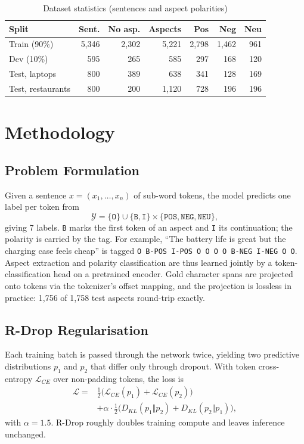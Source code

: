 \documentclass[conference]{IEEEtran}
\begin{document}
\begin{table}[t]
\caption{Dataset statistics (sentences and aspect polarities)}
\label{tab:data}
\centering
\setlength{\tabcolsep}{4pt}
\begin{tabular}{@{}lrrrrrr@{}}
\toprule
Split & Sent. & No asp. & Aspects & Pos & Neg & Neu \\
\midrule
Train (90\%)       & 5,346 & 2,302 & 5,221 & 2,798 & 1,462 & 961 \\
Dev (10\%)         &   595 &   265 &   585 &   297 &   168 & 120 \\
Test, laptops      &   800 &   389 &   638 &   341 &   128 & 169 \\
Test, restaurants  &   800 &   200 & 1,120 &   728 &   196 & 196 \\
\bottomrule
\end{tabular}
\end{table}

\section{Methodology}

\subsection{Problem Formulation}
Given a sentence $x=(x_1,\dots,x_n)$ of sub-word tokens, the model predicts one label per token from
\begin{equation}
\mathcal{Y}=\{\texttt{O}\}\cup\{\texttt{B},\texttt{I}\}\times\{\texttt{POS},\texttt{NEG},\texttt{NEU}\},
\end{equation}
giving 7 labels. \texttt{B} marks the first token of an aspect and \texttt{I} its continuation; the polarity is carried by the tag. For example, ``The battery life is great but the charging case feels cheap'' is tagged \texttt{O B-POS I-POS O O O O B-NEG I-NEG O O}. Aspect extraction and polarity classification are thus learned jointly by a token-classification head on a pretrained encoder. Gold character spans are projected onto tokens via the tokenizer's offset mapping, and the projection is lossless in practice: 1,756 of 1,758 test aspects round-trip exactly.

\subsection{R-Drop Regularisation}
Each training batch is passed through the network twice, yielding two predictive distributions $p_1$ and $p_2$ that differ only through dropout. With token cross-entropy $\mathcal{L}_{CE}$ over non-padding tokens, the loss is
\begin{equation}
\begin{split}
\mathcal{L} ={}& \tfrac{1}{2}\big(\mathcal{L}_{CE}(p_1)+\mathcal{L}_{CE}(p_2)\big)\\
&+ \alpha\cdot\tfrac{1}{2}\big(D_{KL}(p_1\Vert p_2)+D_{KL}(p_2\Vert p_1)\big),
\end{split}
\end{equation}
with $\alpha=1.5$. R-Drop roughly doubles training compute and leaves inference unchanged.
\end{document}
